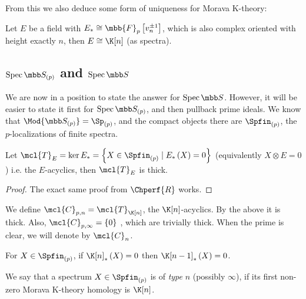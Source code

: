From this we also deduce some form of uniqueness for Morava K-theory:

\begin{corollary}
	Let $E$ be a field with $E_* \cong \mbb{F}_p\left[v_n^{\pm 1}\right]$, which is also complex oriented with height exactly $n$, then $E \cong \K[n]$ (as spectra).
\end{corollary}



\subsection{\texorpdfstring{$\spec \SS_{\left(p\right)}$}{spec S(p)} and \texorpdfstring{$\spec \SS$}{spec S}}

We are now in a position to state the answer for $\spec \SS$.
However, it will be easier to state it first for $\spec \SS_{\left(p\right)}$, and then pullback prime ideals.
We know that $\Mod{\SS_{\left(p\right)}} = \Sp_{\left(p\right)}$, and the compact objects there are $\Spfin_{\left(p\right)}$, the $p$-localizations of finite spectra.

\begin{proposition}
	Let
	$
	\mcl{T}_E
	= \ker E_*
	= \left\{ X \in \Spfin_{\left(p\right)} \mid E_{*}\left(X\right)=0 \right\}$
	(equivalently $X \otimes E = 0$) i.e. the $E$-acyclics, then $\mcl{T}_E$ is thick.
\end{proposition}

\begin{proof}
	The exact same proof from $\Chperf{R}$ works.
\end{proof}

\begin{definition}
	We define $\mcl{C}_{p, n} = \mcl{T}_{\K[n]}$, the $\K[n]$-acyclics.
	By the above it is thick.
	Also, $\mcl{C}_{p, \infty} = \left\{ 0\right\}$ , which are trivially thick.
	When the prime is clear, we will denote by $\mcl{C}_n$.
\end{definition}

\begin{proposition}
	For $X \in \Spfin_{\left(p\right)}$, if $\K[n]_{*}\left(X\right) = 0$ then $\K[n-1]_*\left(X\right) = 0$.
\end{proposition}

\begin{definition}
	We say that a spectrum $X \in \Spfin_{\left(p\right)}$ is of \emph{type} $n$ (possibly $\infty$), if its first non-zero Morava K-theory homology is $\K[n]$.
\end{definition}

